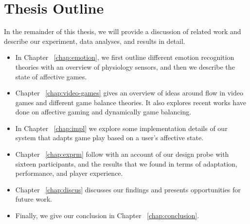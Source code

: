 \section{Thesis Outline}

In the remainder of this thesis, we will provide a discussion of related work and describe our experiment, data analyses, and results in detail.

\begin{itemize}
\item In Chapter ~\ref{chap:emotion}, we first outline different emotion recognition theories with an overview of physiology sensors, and then we describe the state of affective games.
\item Chapter ~\ref{chap:video-games} gives an overview of ideas around flow in video games and different game balance theories. It also explores recent works have done on affective gaming and dynamically game balancing.
\item In Chapter ~\ref{chap:impl} we explore some implementation details of our system that adapts game play based on a user’s affective state.
\item Chapter ~\ref{chap:exprm} follow with an account of our design probe with sixteen participants, and the results that we found in terms of adaptation, performance, and player experience.
\item Chapter ~\ref{chap:discus} discusses our findings and presents opportunities for future work.
\item Finally, we give our conclusion in Chapter ~\ref{chap:conclusion}.
\end{itemize}
